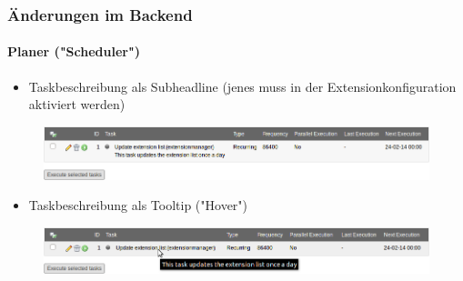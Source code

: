 
\begin{frame}[fragile]
	\frametitle{Änderungen im Backend}
	\framesubtitle{Planer ("Scheduler")}

	\begin{itemize}
		\item Taskbeschreibung als Subheadline\newline
			\small(jenes muss in der Extensionkonfiguration aktiviert werden)\normalsize
	\end{itemize}

	\begin{figure}
		\includegraphics[width=0.95\linewidth]{Images/BackendChanges/SchedulerTaskDescriptionAsSubheader.png}
	\end{figure}

	\begin{itemize}
		\item Taskbeschreibung als Tooltip ("Hover")
	\end{itemize}

	\begin{figure}
		\includegraphics[width=0.95\linewidth]{Images/BackendChanges/SchedulerTaskDescriptionAsTooltip.png}
	\end{figure}

\end{frame}


